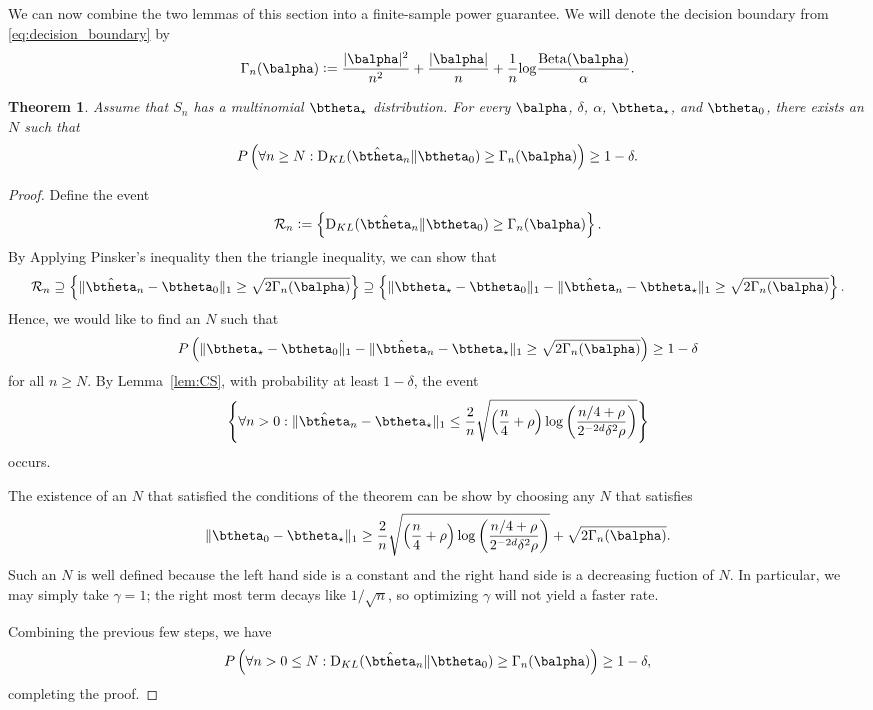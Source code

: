 \documentclass[11pt]{article}
\def\log{{\rm log}}
\newcommand{\Beta}{\mathrm{Beta}}
\newcommand{\KL}{\mathrm{D}_{KL}}
\newtheorem{thm}{Theorem}[section]
\newcommand{\df}{\vcentcolon=}
\newcommand{\pfrac}[2]{\left(\frac{#1}{#2}\right)}
\begin{document}
We can now combine the two lemmas of this section into a finite-sample power guarantee. We will denote the decision boundary from \eqref{eq:decision_boundary} by
\[\Gamma_n(\balpha)
  \df
  \frac{|\balpha|^2}{n^2} + \frac{|\balpha|}{n}
  +
  \frac{1}{n}\log\frac{\Beta(\balpha)}{\alpha}.
\]
\begin{thm}\label{thm:power_lower_bound}
  Assume that $S_n$ has a multinomial $\btheta_\star$ distribution. For every $\balpha$, $\delta$, $\alpha$, $\btheta_\star$, and $\btheta_0$, there exists an $N$ such that
  \begin{equation*}
    P\left(\forall n \geq N: \KL(\hat\btheta_n \Vert \btheta_0) \geq \Gamma_n(\balpha)\right)
    \geq 1-\delta.
  \end{equation*}
\end{thm}
\begin{proof}
  Define the event
  \[
    \mathcal R_n
    \df
    \left\{
    \KL(\hat\btheta_n \Vert \btheta_0) \geq \Gamma_n(\balpha)
  \right\}.
\]
By Applying Pinsker's inequality then the triangle inequality, we can show that
\[
  \mathcal R_n \supseteq
  \left\{
    \Vert \hat\btheta_n - \btheta_0\Vert_1 \geq \sqrt{2\Gamma_n(\balpha)}
  \right\}
  \supseteq
    \left\{
      \Vert \btheta_\star - \btheta_0\Vert_1
      -
      \Vert \hat\btheta_n - \btheta_\star\Vert_1
      \geq \sqrt{2\Gamma_n(\balpha)}
  \right\}.
\]
Hence, we would like to find an $N$ such that
\[
      P\left(
      \Vert \btheta_\star - \btheta_0\Vert_1
      -
      \Vert \hat\btheta_n - \btheta_\star\Vert_1
      \geq \sqrt{2\Gamma_n(\balpha)}
  \right)\geq 1-\delta
\]
for all $n\geq N$. By Lemma~\ref{lem:CS}, with probability at least $1-\delta$, the event
\begin{align*}
  \left\{ \forall n > 0:
  \Vert\hat\btheta_n- \btheta_\star\Vert_1
  \leq
    \frac{2}{n}\sqrt{\left(\frac{n}{4} + \rho\right)\log\pfrac{n/4+\rho}{2^{-2d}\delta^2 \rho}}\right\}
\end{align*}
occurs.

The existence of an $N$ that satisfied the conditions of the theorem can be show by choosing any $N$ that satisfies
\[
  \Vert \btheta_0- \btheta_\star\Vert_{1}
    \geq
        \frac{2}{n}\sqrt{\left(\frac{n}{4} + \rho\right)\log\pfrac{n/4+\rho}{2^{-2d}\delta^2 \rho}}
    + \sqrt{2\Gamma_n(\balpha)}.
  \]
Such an $N$ is well defined because the left hand side is a constant and the right hand side is a decreasing fuction of $N$. In particular, we may simply take $\gamma = 1$; the right most term decays like $1/\sqrt{n}$, so optimizing $\gamma$ will not yield a faster rate. 


Combining the previous few steps, we have
\begin{equation*}
    P\left(\forall n>0 \leq N: \KL(\hat\btheta_n \Vert \btheta_0) \geq \Gamma_n(\balpha)\right)
    \geq 1-\delta,
  \end{equation*}
  completing the proof.
\end{proof}
\end{document}
